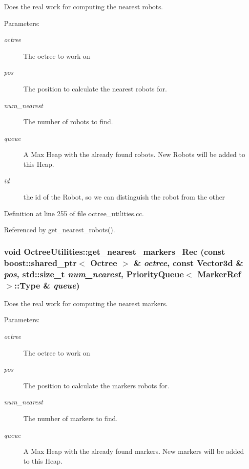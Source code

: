 Does the real work for computing the nearest robots.

\begin{Desc}
\item[Parameters:]
\begin{description}
\item[{\em octree}]The octree to work on \item[{\em pos}]The position to calculate the nearest robots for. \item[{\em num\_\-nearest}]The number of robots to find. \item[{\em queue}]A Max Heap with the already found robots. New Robots will be added to this Heap. \item[{\em id}]the id of the Robot, so we can distinguish the robot from the other \end{description}
\end{Desc}


Definition at line 255 of file octree\_\-utilities.cc.

Referenced by get\_\-nearest\_\-robots().\hypertarget{class_octree_utilities_9ccc20518e6adfa2f2d7d28d368d53c2}{
\subsubsection[get\_\-nearest\_\-markers\_\-Rec]{\setlength{\rightskip}{0pt plus 5cm}void OctreeUtilities::get\_\-nearest\_\-markers\_\-Rec (const boost::shared\_\-ptr$<$ {\bf Octree} $>$ \& {\em octree}, \/  const Vector3d \& {\em pos}, \/  std::size\_\-t {\em num\_\-nearest}, \/  PriorityQueue$<$ MarkerRef $>$::Type \& {\em queue})}}
\label{class_octree_utilities_9ccc20518e6adfa2f2d7d28d368d53c2}


Does the real work for computing the nearest markers.

\begin{Desc}
\item[Parameters:]
\begin{description}
\item[{\em octree}]The octree to work on \item[{\em pos}]The position to calculate the markers robots for. \item[{\em num\_\-nearest}]The number of markers to find. \item[{\em queue}]A Max Heap with the already found markers. New markers will be added to this Heap. \end{description}
\end{Desc}


